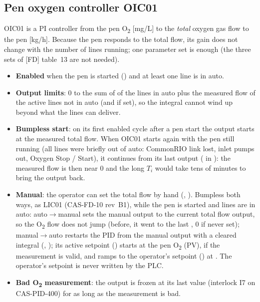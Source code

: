 \documentclass[11pt,a4paper]{article}
\newcommand{\Otwo}{O\textsubscript{2}}
\begin{document}
\subsection{Pen oxygen controller OIC01}
OIC01 is a PI controller from the pen \Otwo{} [mg/L] to the \emph{total} oxygen gas flow to the
pen [kg/h]. Because the pen responds to the total flow, its gain does not change with the number
of lines running; one parameter set is enough (the three sets of [FD] table~13 are not needed).
\begin{itemize}[nosep]
  \item \textbf{Enabled} when the pen is started () and at least one line is in auto.
  \item \textbf{Output limits}: 0 to the sum of  of the lines in auto plus the
        measured flow of the active lines not in auto (and  if set), so the
        integral cannot wind up beyond what the lines can deliver.
  \item \textbf{Bumpless start}: on its first enabled cycle after a pen start the output starts at
        the measured total flow. When OIC01 starts again with the pen still running (all lines were
        briefly out of auto: CommonRIO link lost, inlet pumps out, Oxygen Stop / Start), it continues
        from its last output ( in ): the measured flow is then near 0
        and the long $T_i$ would take tens of minutes to bring the output back.
  \item \textbf{Manual}: the operator can set the total flow by hand
        (, ). Bumpless both ways, as LIC01
        (CAS-FD-10 rev~B1), while the pen is started and lines are in auto: auto$\to$manual sets the
        manual output to the current total flow output, so the \Otwo{} flow does not jump (before, it
        went to the last , 0 if never set); manual$\to$auto restarts
        the PID from the manual output with a cleared integral (, ); its active
        setpoint () starts at the pen \Otwo{} (PV), if the measurement
        is valid, and ramps to the operator's setpoint () at .
        The operator's setpoint is never written by the PLC.
  \item \textbf{Bad \Otwo{} measurement}: the output is frozen at its last value (interlock I7
        on CAS-PID-400) for as long as the measurement is bad.
\end{itemize}
\end{document}
